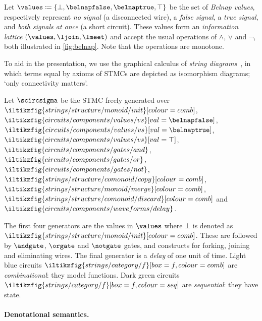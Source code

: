 \documentclass[10pt]{article}
\begin{document}
\begin{definition}
    Let \(\values \coloneqq \{\bot,\belnapfalse,\belnaptrue,\top\}\) be the set
    of \emph{Belnap values}, respectively represent \emph{no signal}
    (a disconnected wire), a \emph{false signal}, a \emph{true signal}, and
    \emph{both signals at once} (a short circuit).
    These values form an \emph{information lattice} \((\values,\ljoin,\lmeet)\)
    and accept the usual operations of \(\land\), \(\lor\) and \(\neg\), both
    illustrated in \cref{fig:belnap}.
    Note that the operations are monotone.
\end{definition}

To aid in the presentation, we use the graphical calculus of
\emph{string diagrams}~\cite{joyal1991geometry,joyal1996traced,selinger2011survey},
in which terms equal by axioms of STMCs are depicted as isomorphism diagrams;
`only connectivity matters'.

\begin{definition}
    Let \(\scircsigma\) be the STMC freely generated over \(
    \iltikzfig{strings/structure/monoid/init}[colour=comb]
    \), \(
    \iltikzfig{circuits/components/values/vs}[val=\belnapfalse]
    \), \(
    \iltikzfig{circuits/components/values/vs}[val=\belnaptrue]
    \), \(
    \iltikzfig{circuits/components/values/vs}[val=\top]
    \), \(
    \iltikzfig{circuits/components/gates/and}
    \), \(
    \iltikzfig{circuits/components/gates/or}
    \), \(
    \iltikzfig{circuits/components/gates/not}
    \), \(
    \iltikzfig{strings/structure/comonoid/copy}[colour=comb]
    \), \(
    \iltikzfig{strings/structure/monoid/merge}[colour=comb]
    \), \(
    \iltikzfig{strings/structure/comonoid/discard}[colour=comb]
    \) and \(
    \iltikzfig{circuits/components/waveforms/delay}
    \).
\end{definition}

The first four generators are the values in \(\values\) where \(\bot\)
is denoted as \(\iltikzfig{strings/structure/monoid/init}[colour=comb]\).
These are followed by \(\andgate\), \(\orgate\) and \(\notgate\) gates, and
constructs for forking, joining and eliminating wires.
The final generator is a \emph{delay} of one unit of time.
Light blue circuits \(
\iltikzfig{strings/category/f}[box=f,colour=comb]
\)  are \emph{combinational}: they model functions.
Dark green circuits \(
\iltikzfig{strings/category/f}[box=f,colour=seq]
\) are \emph{sequential}: they have state.

\paragraph*{Denotational semantics.}
\end{document}

